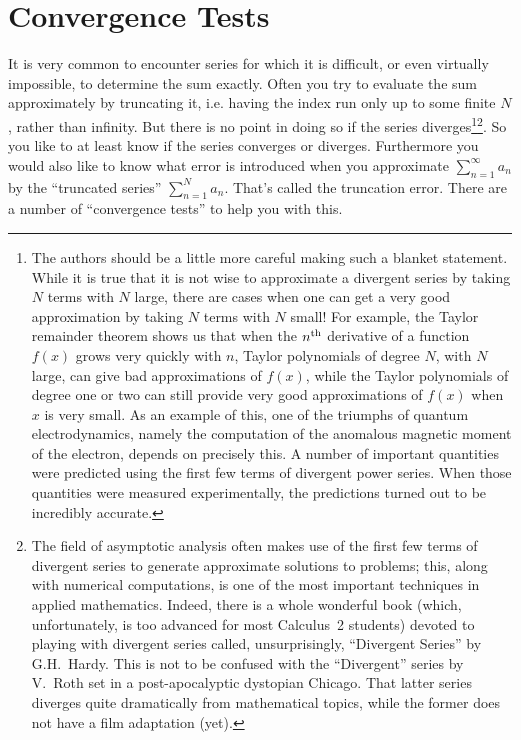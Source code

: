 \section{Convergence Tests}

It is very common to encounter series for which it is difficult, or even
virtually impossible, to determine the sum exactly. Often you try to evaluate
the sum approximately by truncating it, i.e. having the index run only
up to some finite $N$, rather than infinity. But there is no point in doing
so if the series diverges\footnote{
The authors should be a little more careful making such a blanket statement. While it is true that it is not wise to approximate a divergent series by taking \(N\) terms with \(N\) large, there are cases when one can get a very good approximation by taking \(N\) terms with \(N\) small! For example, the Taylor remainder theorem shows us that when the \(n^{\rm th}\) derivative of a function \(f(x)\) grows very quickly with \(n\), Taylor polynomials of degree \(N\), with \(N\) large, can give bad approximations of \(f(x)\), while the Taylor polynomials of degree one or two can still provide very good approximations of \(f(x)\) when \(x\) is very small. As an example of this, one of the triumphs of quantum electrodynamics, namely the computation of the anomalous magnetic moment of the electron, depends on precisely this. A number of important quantities were predicted using the first few terms of divergent power series. When those quantities were measured experimentally, the predictions turned out to be incredibly accurate.
}\footnote{
The field of asymptotic analysis often makes use of the first few terms of divergent series to generate approximate solutions to problems; this, along with numerical computations, is one of the most important techniques in applied mathematics. Indeed, there is a whole wonderful book  (which, unfortunately, is too advanced for most Calculus~2 students) devoted to playing with divergent series called, unsurprisingly, ``Divergent Series'' by G.H.~Hardy. This is not to be confused with the ``Divergent'' series by V.~Roth set in a post-apocalyptic dystopian Chicago. That latter series diverges quite dramatically from mathematical topics, while the former does not have a film adaptation (yet).
}. So you like to at least know if the series converges
or diverges. Furthermore you would also like to know what error is introduced
when you approximate $\sum_{n=1}^\infty a_n$ by the ``truncated series''
$\sum_{n=1}^Na_n$. That's called the truncation error. There are a number
of ``convergence tests'' to help you with this.

